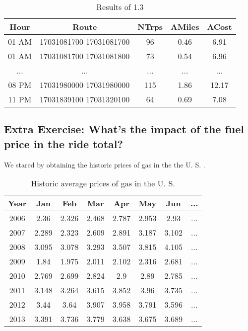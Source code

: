 \documentclass[conference,compsoc]{IEEEtran}
\begin{document}
\begin{table}[!t]
\renewcommand{\arraystretch}{1.3}
\caption{Results of 1.3}
\label{output_1_3}
\centering
\begin{tabular}{c|c||c|c|c}
\hline
\bfseries Hour & \bfseries Route & \bfseries NTrps & \bfseries AMiles & \bfseries ACost\\
\hline\hline

01 AM&17031081700 17031081700&96&0.46&6.91	\\
01 AM&17031081700 17031081800&73&0.54&6.96	\\
...&...&...&...&...	\\
08 PM&17031980000 17031980000&115&1.86&12.17\\
11 PM&17031839100 17031320100&64&0.69&7.08	\\

\hline
\end{tabular}
\end{table}

\subsection{Extra Exercise: What's the impact of the fuel price in the ride total?}
We stared by obtaining the historic prices of gas in the the U. S. \cite{IEEEhowto:oil_price}.

\begin{table}[!t]
\renewcommand{\arraystretch}{1.3}
\caption{Historic average prices of gas in the U. S.}
\label{oil_prices}
\centering
\begin{tabular}{c||c|c|c|c|c|c|c}
\hline
\bfseries Year&  \bfseries Jan&  \bfseries Feb& \bfseries Mar& \bfseries Apr& \bfseries May& \bfseries Jun& \bfseries ...\\
\hline\hline
2006& 2.36&2.326&2.468&2.787&2.953& 2.93&...\\
2007&2.289&2.323&2.609&2.891&3.187&3.102&...\\
2008&3.095&3.078&3.293&3.507&3.815&4.105&...\\
2009& 1.84&1.975&2.011&2.102&2.316&2.681&...\\
2010&2.769&2.699&2.824&  2.9& 2.89&2.785&...\\
2011&3.148&3.264&3.615&3.852& 3.96&3.735&...\\
2012& 3.44& 3.64&3.907&3.958&3.791&3.596&...\\
2013&3.391&3.736&3.779&3.638&3.675&3.689&...\\
\hline
\end{tabular}
\end{table}
\end{document}
